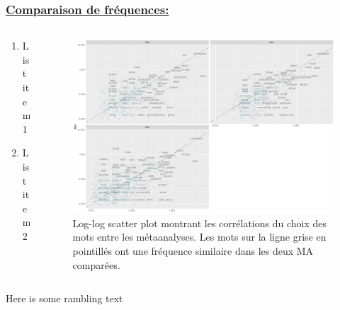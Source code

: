 \documentclass[xcolor=dvipsnames]{beamer}
\begin{document}
	\begin{frame}
		\frametitle{\underline{Comparaison de fréquences:}}
		\begin{columns}
			\begin{column}{0.5\textwidth} %
				\begin{enumerate}
					\item List item 1
					\item List item 2
				\end{enumerate}
			\end{column}
			\begin{column}{0.5\textwidth}
				\begin{figure}[htb] %
					\begin{center} %
						\includegraphics[width=1\textwidth]{scales_graph.png}
						\caption{Log-log scatter plot montrant les corrélations du choix des mots entre les métaanalyses. Les mots sur la ligne grise en pointillés ont une fréquence similaire dans les deux MA comparées.}\label{log_log_sp}
					\end{center}
				\end{figure}
			\end{column}
		\end{columns}
		\vspace{\baselineskip}
		Here is some rambling text
	\end{frame}
\end{document}
